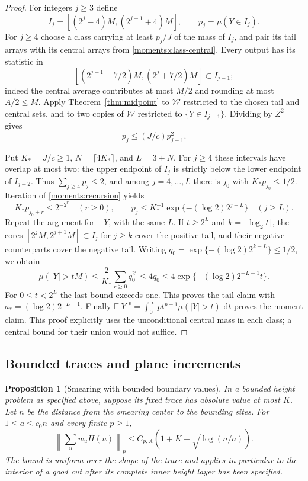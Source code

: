 \documentclass[11pt]{article}
\newtheorem{proposition}[theorem]{Proposition}
\theoremstyle{definition}
\theoremstyle{remark}
\numberwithin{equation}{section}
\begin{document}
\begin{proof}
For integers $j\geq3$ define
\[
 I_j=[(2^j-4)M,(2^{j+1}+4)M],\qquad p_j=\mu(Y\in I_j).
\]
For $j\geq4$ choose a class carrying at least $p_j/J$ of the mass of
$I_j$, and pair its tail arrays with its central arrays from
\eqref{moments:class-central}.  Every output has its statistic in
\[
 [(2^{j-1}-7/2)M,(2^j+7/2)M]\subset I_{j-1};
\]
indeed the central average contributes at most $M/2$ and rounding at
most $A/2\leq M$.  Apply Theorem~\ref{thm:midpoint} to $\mathcal W$ restricted
to the chosen tail and central sets, and to two copies of $\mathcal W$ restricted
to $\{Y\in I_{j-1}\}$.  Dividing by $Z^2$ gives
\begin{equation}\label{moments:recursion}
 p_j\leq (J/c)p_{j-1}^2.
\end{equation}

Put $K_*=J/c\geq1$, $N=\lceil4K_*\rceil$, and $L=3+N$.
For $j\geq4$ these intervals have overlap at most two: the upper
endpoint of $I_j$ is strictly below the lower endpoint of $I_{j+2}$.
Thus $\sum_{j\geq4}p_j\leq2$, and among $j=4,\ldots,L$ there is
$j_0$ with $K_*p_{j_0}\leq1/2$.  Iteration of
\eqref{moments:recursion} yields
\[
 K_*p_{j_0+r}\leq2^{-2^r}\quad(r\geq0),
 \qquad
 p_j\leq K_*^{-1}
 \exp\{- (\log2)2^{j-L}\}\quad(j\geq L).
\]
Repeat the argument for $-Y$, with the same $L$.  If $t\geq2^L$ and
$k=\lfloor\log_2t\rfloor$, the cores
$[2^jM,2^{j+1}M]\subset I_j$ for $j\geq k$ cover the positive tail,
and their negative counterparts cover the negative tail.  Writing
$q_0=\exp\{-(\log2)2^{k-L}\}\leq1/2$, we obtain
\[
 \mu(|Y|>tM)
 \leq\frac2{K_*}\sum_{r\geq0}q_0^{2^r}
 \leq4q_0
 \leq4\exp\{- (\log2)2^{-L-1}t\}.
\]
For $0\leq t<2^L$ the last bound exceeds one.  This proves the tail
claim with $a_*=(\log2)2^{-L-1}$.  Finally
$\mathbb E|Y|^p=\int_0^\infty pt^{p-1}\mu(|Y|>t)\,\,\mathrm d t$ proves the moment
claim.  This proof explicitly uses the unconditional central mass in
each class; a central bound for their union would not suffice.
\end{proof}

\subsection{Bounded traces and plane increments}

\begin{proposition}[Smearing with bounded boundary values]
\label{prop:smearing}
In a bounded height problem as specified above, suppose its fixed trace
has absolute value at most $K$.  Let $n$ be the distance from the
smearing center to the bounding sites.  For
$1\leq a\leq c_0n$ and every finite $p\geq1$,
\begin{equation}\label{moments:smearing-bound}
 \left\|\sum_uw_uH(u)\right\|_p
 \leq C_{p,A}\left(1+K+\sqrt{\log(n/a)}\right).
\end{equation}
The bound is uniform over the shape of the trace and applies in
particular to the interior of a good cut after its complete inner
height layer has been specified.
\end{proposition}
\end{document}
